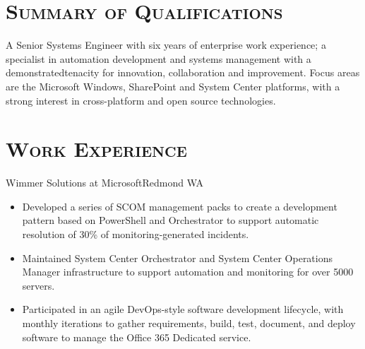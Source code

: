 \documentclass[11pt,letter,roman]{moderncv} %
\begin{document}
\makecvtitle

\vspace{-\baselineskip}

\section{\textsc{Summary of Qualifications}}
A Senior Systems Engineer with six years of enterprise work
experience; a specialist in automation development and systems management
with a demonstratedtenacity for innovation, collaboration and improvement.
Focus areas are the Microsoft Windows, SharePoint and System Center platforms,
with a strong interest in cross-platform and open source technologies.

\section{\textsc{Work Experience}}
{Wimmer Solutions at Microsoft}{Redmond WA}{}{%
  \begin{itemize}
    \item Developed a series of SCOM management packs to create a development
      pattern based on PowerShell and Orchestrator to support automatic
      resolution of 30\% of monitoring-generated incidents.
    \item Maintained System Center Orchestrator and System Center Operations
      Manager infrastructure to support automation and monitoring for over
      5000 servers.
    \item Participated in an agile DevOps-style software development
      lifecycle, with monthly iterations to gather requirements, build, test,
      document, and deploy software to manage the Office 365 Dedicated service.
  \end{itemize}
}
\end{document}
